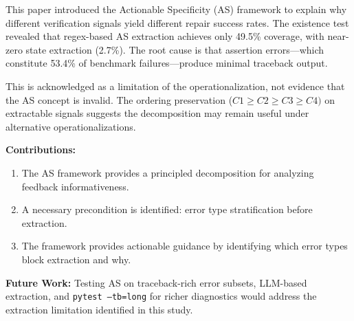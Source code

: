 
This paper introduced the Actionable Specificity (AS) framework to explain why different verification signals yield different repair success rates. The existence test revealed that regex-based AS extraction achieves only 49.5\% coverage, with near-zero state extraction (2.7\%). The root cause is that assertion errors---which constitute 53.4\% of benchmark failures---produce minimal traceback output.

This is acknowledged as a limitation of the operationalization, not evidence that the AS concept is invalid. The ordering preservation ($C1\geq C2\geq C3\geq C4)$ on extractable signals suggests the decomposition may remain useful under alternative operationalizations.

\textbf{Contributions:}
\begin{enumerate}
\item The AS framework provides a principled decomposition for analyzing feedback informativeness.
\item A necessary precondition is identified: error type stratification before extraction.
\item The framework provides actionable guidance by identifying which error types block extraction and why.
\end{enumerate}

\textbf{Future Work:} Testing AS on traceback-rich error subsets, LLM-based extraction, and \texttt{pytest --tb=long} for richer diagnostics would address the extraction limitation identified in this study.


